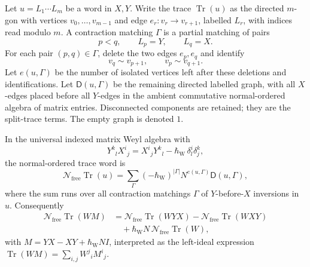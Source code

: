 \begin{defn}
\label{def:app-free-indexed-normal-diagrams}
  Let \(u=L_1\cdots L_m\) be a word in \(X,Y\).  Write the trace
  \(\operatorname{Tr}(u)\) as the directed \(m\)-gon with vertices
  \(v_0,\ldots,v_{m-1}\) and edge \(e_r:v_r\to v_{r+1}\), labelled
  \(L_r\), with indices read modulo \(m\).  A contraction matching
  \(\Gamma\) is a partial matching of pairs
  \[
    p<q,\qquad L_p=Y,\qquad L_q=X .
  \]
  For each pair \((p,q)\in\Gamma\), delete the two edges \(e_p,e_q\)
  and identify
  \[
    v_q\sim v_{p+1},\qquad v_p\sim v_{q+1}.
  \]
  Let \(e(u,\Gamma)\) be the number of isolated vertices left after
  these deletions and identifications.  Let
  \(\mathsf D(u,\Gamma)\) be the remaining directed labelled graph,
  with all \(X\)-edges placed before all \(Y\)-edges in the ambient
  commutative normal-ordered algebra of matrix entries.  Disconnected
  components are retained; they are the split-trace terms.  The empty
  graph is denoted \(1\).
\end{defn}

\begin{thm}
\label{thm:app-free-indexed-normal-ordering}
  In the universal indexed matrix Weyl algebra with
  \[
    Y^k{}_lX^i{}_j=X^i{}_jY^k{}_l-\hbar_{\mathrm{W}}\,\delta^i_l\delta^k_j,
  \]
  the normal-ordered trace word is
  \[
    \mathcal N_{\mathrm{free}}\operatorname{Tr}(u)
    =
    \sum_{\Gamma}
      (-\hbar_{\mathrm{W}})^{|\Gamma|}
      N^{e(u,\Gamma)}
      \mathsf D(u,\Gamma),
  \]
  where the sum runs over all contraction matchings
  \(\Gamma\) of \(Y\)-before-\(X\) inversions in \(u\).  Consequently
  \[
  \begin{aligned}
    \mathcal N_{\mathrm{free}}\operatorname{Tr}(W M)
    &=
      \mathcal N_{\mathrm{free}}\operatorname{Tr}(WYX)
      -\mathcal N_{\mathrm{free}}\operatorname{Tr}(WXY)\\
    &\quad
      +\hbar_{\mathrm{W}} N\,\mathcal N_{\mathrm{free}}\operatorname{Tr}(W),
  \end{aligned}
  \]
  with \(M=YX-XY+\hbar_{\mathrm{W}} N I\), interpreted as the left-ideal expression
  \(\operatorname{Tr}(W M)=\sum_{i,j}W^j{}_iM^i{}_j\).
\end{thm}

